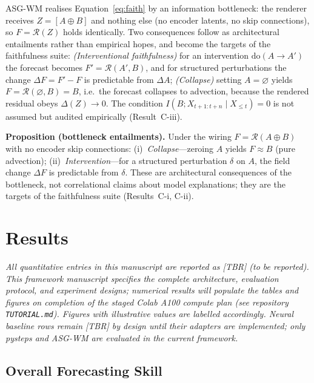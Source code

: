 \documentclass[fleqn,10pt]{wlscirep}
\begin{document}
ASG-WM realises Equation~\ref{eq:faith} by an information bottleneck: the renderer receives $Z=[A \oplus B]$ and nothing else (no encoder latents, no skip connections), so $F=\mathcal{R}(Z)$ holds identically.
Two consequences follow as architectural entailments rather than empirical hopes, and become the targets of the faithfulness suite:
\emph{(Interventional faithfulness)} for an intervention $\mathrm{do}(A\!\to\!A')$ the forecast becomes $F'=\mathcal{R}(A',B)$, and for structured perturbations the change $\Delta F=F'-F$ is predictable from $\Delta A$;
\emph{(Collapse)} setting $A=\varnothing$ yields $F=\mathcal{R}(\varnothing,B)=B$, i.e.\ the forecast collapses to advection, because the rendered residual obeys $\Delta(Z)\!\to\!0$.
The condition $I(B; X_{t+1:t+n}\mid X_{\le t})=0$ is not assumed but audited empirically (Result~C-iii).

\noindent\textbf{Proposition (bottleneck entailments).}
Under the wiring $F=\mathcal{R}(A \oplus B)$ with no encoder skip connections:
(i)~\emph{Collapse}---zeroing $A$ yields $F \approx B$ (pure advection);
(ii)~\emph{Intervention}---for a structured perturbation $\delta$ on $A$, the field change $\Delta F$ is predictable from $\delta$.
These are architectural consequences of the bottleneck, not correlational claims about model explanations; they are the targets of the faithfulness suite (Results~C-i, C-ii).

\section*{Results}

\noindent\emph{All quantitative entries in this manuscript are reported as [TBR] (to be reported). This framework manuscript specifies the complete architecture, evaluation protocol, and experiment designs; numerical results will populate the tables and figures on completion of the staged Colab A100 compute plan (see repository \texttt{TUTORIAL.md}). Figures with illustrative values are labelled accordingly. Neural baseline rows remain [TBR] by design until their adapters are implemented; only pysteps and ASG-WM are evaluated in the current framework.}

\subsection*{Overall Forecasting Skill}
\end{document}
